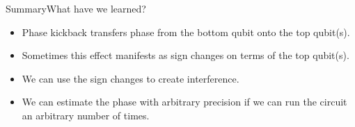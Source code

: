 \begin{frame}{Summary}{What have we learned?}

\begin{itemize}
    \item Phase kickback transfers phase from the bottom qubit onto the top qubit(s).
    \item Sometimes this effect manifests as sign changes on terms of the top qubit(s).
    \item We can use the sign changes to create interference.
    \item We can estimate the phase with arbitrary precision if we can run the circuit an arbitrary number of times.
\end{itemize}
    
\end{frame}
